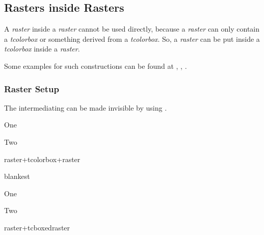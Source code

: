 \clearpage
\subsection{Rasters inside Rasters}\label{subsec:raster_insideraster}

A \emph{raster} inside a \emph{raster} cannot be used directly, because
a \emph{raster} can only contain a \emph{tcolorbox} or something
derived from a \emph{tcolorbox}. So, a \emph{raster} can be put inside
a \emph{tcolorbox} inside a \emph{raster}.

Some examples for such constructions can be found at ,
,
.


\subsubsection{Raster Setup}
The intermediating  can be made invisible by using
.

\begin{dispExample}
\begin{tcbraster}[raster equal height=rows,
  raster every box/.style={colframe=red!50!black,colback=red!10!white}]
  \begin{tcolorbox}[blankest]
    \begin{tcbraster}[raster columns=1]
      \begin{tcolorbox}One\end{tcolorbox}
      \begin{tcolorbox}Two\end{tcolorbox}
    \end{tcbraster}
  \end{tcolorbox}
  \begin{tcolorbox}raster+tcolorbox+raster\end{tcolorbox}
\end{tcbraster}
\end{dispExample}

\enlargethispage*{1cm}
\begin{dispExample}
\begin{tcbraster}[raster equal height=rows,
  raster every box/.style={colframe=red!50!black,colback=red!10!white}]
  \begin{tcboxedraster}[raster columns=1]{blankest}
    \begin{tcolorbox}One\end{tcolorbox}
    \begin{tcolorbox}Two\end{tcolorbox}
  \end{tcboxedraster}
  \begin{tcolorbox}raster+tcboxedraster\end{tcolorbox}
\end{tcbraster}
\end{dispExample}


